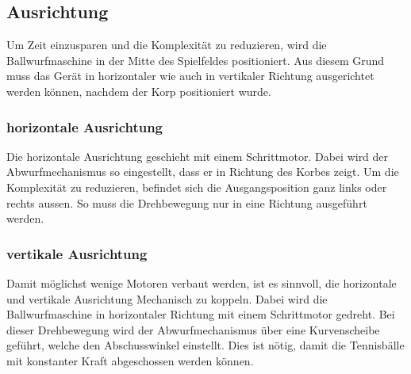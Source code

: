 \subsection{Ausrichtung}
Um Zeit einzusparen und die Komplexität zu reduzieren, wird die Ballwurfmaschine in der Mitte des Spielfeldes positioniert. Aus diesem Grund muss das Gerät in horizontaler wie auch in vertikaler Richtung ausgerichtet werden können, nachdem der Korp positioniert wurde. 

\subsubsection{horizontale Ausrichtung}
Die horizontale Ausrichtung geschieht mit einem Schrittmotor. Dabei wird der Abwurfmechanismus so eingestellt, dass er in Richtung des Korbes zeigt. Um die Komplexität zu reduzieren, befindet sich die Ausgangsposition ganz links oder rechts aussen. So muss die Drehbewegung nur in eine Richtung ausgeführt werden.

\subsubsection{vertikale Ausrichtung}
Damit möglichst wenige Motoren verbaut werden, ist es sinnvoll, die horizontale und vertikale Ausrichtung Mechanisch zu koppeln. Dabei wird die Ballwurfmaschine in horizontaler Richtung mit einem Schrittmotor gedreht. Bei dieser Drehbewegung wird der Abwurfmechanismus über eine Kurvenscheibe geführt, welche den Abschusswinkel einstellt. Dies ist nötig, damit die Tennisbälle mit konstanter Kraft abgeschossen werden können.